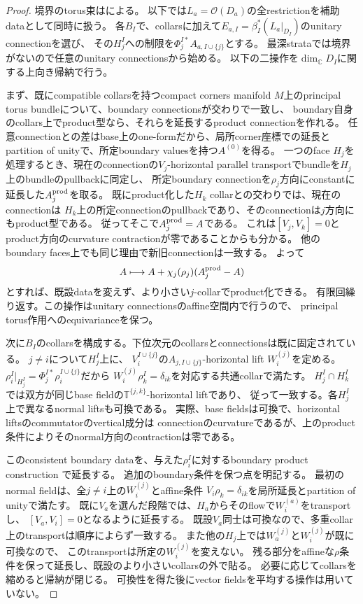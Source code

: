 \documentclass[11pt,a4paper]{ltjsarticle}
\newcommand{\CC}{\mathbb C}
\theoremstyle{plain}
\theoremstyle{definition}
\theoremstyle{remark}
\begin{document}
\begin{proof}
境界のtorus束は\cite[Lemma~1.1, (1.10)--(1.15)]{RochonZhang}による。
以下では$L_a=\mathcal O(D_a)$の全restrictionを補助dataとして同時に扱う。
各$B_I$で、collarsに加えて$E_{a,I}=\beta_I^*(L_a|_{D_I})$のunitary connectionを選び、
その$H_j^I$への制限を$\Phi_j^{I*}A_{a,I\cup\{j\}}$とする。
最深strataでは境界がないので任意のunitary connectionsから始める。
以下の二操作を$\dim_\CC D_I$に関する上向き帰納で行う。

まず、既にcompatible collarsを持つcompact corners manifold $M$上のprincipal
torus bundleについて、boundary connectionsが交わりで一致し、
boundary自身のcollars上でproduct型なら、それらを延長するproduct connectionを作れる。
任意connectionとの差はbase上のone-formだから、局所corner座標での延長と
partition of unityで、所定boundary valuesを持つ$A^{(0)}$を得る。
一つのface $H_j$を処理するとき、現在のconnectionの$V_j$-horizontal
parallel transportでbundleを$H_j$上のbundleのpullbackに同定し、
所定boundary connectionを$\rho_j$方向にconstantに延長した$A_j^{\rm prod}$を取る。
既にproduct化した$H_k$ collarとの交わりでは、現在のconnectionは
$H_k$上の所定connectionのpullbackであり、そのconnectionは$j$方向にもproduct型である。
従ってそこで$A_j^{\rm prod}=A$である。
これは$[V_j,V_k]=0$とproduct方向のcurvature contractionが零であることからも分かる。
他のboundary faces上でも同じ理由で新旧connectionは一致する。
よって
\[
 A\longmapsto A+\chi_j(\rho_j)(A_j^{\rm prod}-A)
\]
とすれば、既設dataを変えず、より小さい$j$-collarでproduct化できる。
有限回繰り返す。この操作はunitary connectionsのaffine空間内で行うので、
principal torus作用へのequivarianceを保つ。

次に$B_I$のcollarsを構成する。下位次元のcollarsとconnectionsは既に固定されている。
$j\ne i$について$H_j^I$上に、
$V_i^{I\cup\{j\}}$の$A_{j,I\cup\{j\}}$-horizontal lift $W_i^{(j)}$を定める。
$\rho_i^I|_{H_j^I}=\Phi_j^{I*}\rho_i^{I\cup\{j\}}$だから
$W_i^{(j)}\rho_k^I=\delta_{ik}$を対応する共通collarで満たす。
$H_j^I\cap H_k^I$では双方が同じbase fieldの$\mathbb T^{\{j,k\}}$-horizontal liftであり、
従って一致する。各$H_j^I$上で異なるnormal liftsも可換である。
実際、base fieldsは可換で、horizontal liftsのcommutatorのvertical成分は
connectionのcurvatureであるが、上のproduct条件によりそのnormal方向のcontractionは零である。

このconsistent boundary dataを、与えた$\rho_i^I$に対するboundary product
construction \cite[Proposition~1.2, (1.3)--(1.4)]{AlbinMelrose}で延長する。
追加のboundary条件を保つ点を明記する。
最初のnormal fieldは、全$j\ne i$上の$W_i^{(j)}$とaffine条件
$V_i\rho_k=\delta_{ik}$を局所延長とpartition of unityで満たす。
既に$V_a$を選んだ段階では、$H_a$からそのflowで$W_i^{(a)}$をtransportし、
$[V_a,V_i]=0$となるように延長する。
既設$V_a$同士は可換なので、多重collar上のtransportは順序によらず一致する。
また他の$H_j$上では$W_a^{(j)}$と$W_i^{(j)}$が既に可換なので、
このtransportは所定の$W_i^{(j)}$を変えない。
残る部分をaffineな$\rho$条件を保って延長し、既設のより小さいcollarsの外で貼る。
必要に応じてcollarsを縮めると帰納が閉じる。
可換性を得た後にvector fieldsを平均する操作は用いていない。


\end{proof}
\end{document}
